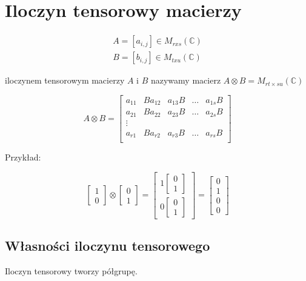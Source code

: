 \documentclass{article}
\newcommand\CC{\mathbb{C}}
\begin{document}
\section{Iloczyn tensorowy macierzy}

$$
\begin{aligned}
A = [ a_{i,j} ] \in M_{r x s}(\CC) \\
B = [ b_{i,j} ] \in M_{t x u}(\CC)
\end{aligned}
$$

iloczynem tensorowym macierzy $A$ i $B$ nazywamy macierz $ A \otimes B = M_{rt \times su}(\CC) $


$$
A \otimes B = \begin{bmatrix}
	a_{11} & B a_{12} & a_{13} B & \dots & a_{1s} B \\
	a_{21} & B a_{22} & a_{23} B & \dots & a_{2s} B \\
	\vdots                                          \\
	a_{r1} & B a_{r2} & a_{r3} B & \dots & a_{rs} B \\
\end{bmatrix}
$$

Przykład:

$$
\begin{bmatrix}1 \\ 0\end{bmatrix} \otimes \begin{bmatrix}0 \\ 1\end{bmatrix} =
	\begin{bmatrix}1 \begin{bmatrix} 0 \\ 1 \end{bmatrix} \\ 0 \begin{bmatrix} 0 \\ 1 \end{bmatrix} \end{bmatrix} = \begin{bmatrix} 0 \\ 1 \\ 0 \\ 0 \end{bmatrix}
$$

\subsection{Własności iloczynu tensorowego}

Iloczyn tensorowy tworzy półgrupę.
\end{document}
